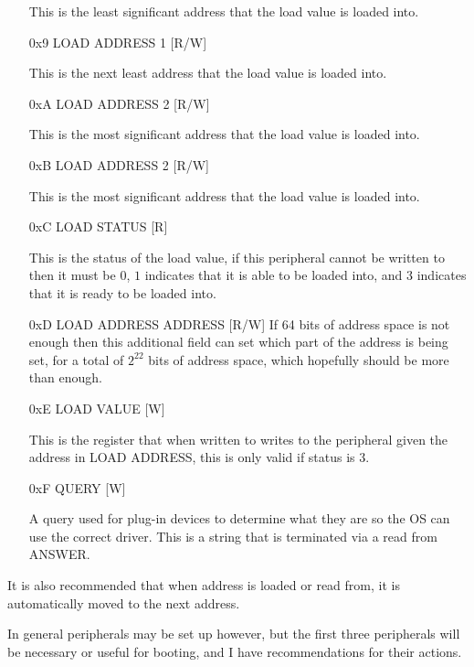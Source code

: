 \documentclass[12pt,letterpaper]{report}
\newcommand{\ronly}{[R]}
\newcommand{\wonly}{[W]}
\newcommand{\rw}{[R/W]}
\begin{document}
\begin{enumerate}
This is the least significant address that the load value is loaded into.
\item[0x9] LOAD ADDRESS 1 \rw

This is the next least address that the load value is loaded into.
\item[0xA] LOAD ADDRESS 2 \rw

This is the most significant address that the load value is loaded into.
\item[0xB] LOAD ADDRESS 2 \rw

This is the most significant address that the load value is loaded into.
\item[0xC] LOAD STATUS \ronly

This is the status of the load value, if this peripheral cannot be written to then it must be $0$, $1$ indicates that it is able to be loaded into, and $3$ indicates that it is ready to be loaded into.
\item[0xD] LOAD ADDRESS ADDRESS \rw
If 64 bits of address space is not enough then this additional field can set which part of the address is being set, for a total of 
$2^{22}$ bits of address space, which hopefully should be more than enough.
\item[0xE] LOAD VALUE \wonly

This is the register that when written to writes to the peripheral given the address in LOAD ADDRESS, this is only valid if status is $3$.

\item[0xF] QUERY \wonly

A query used for plug-in devices to determine what they are so the OS can use the correct driver. This is a string that is terminated via a read from ANSWER.
\end{enumerate}

It is also recommended that when address is loaded or read from, it is automatically moved to the next address.

In general peripherals may be set up however, but the first three peripherals will be necessary or useful for booting, and I have recommendations for their actions.
\end{document}
